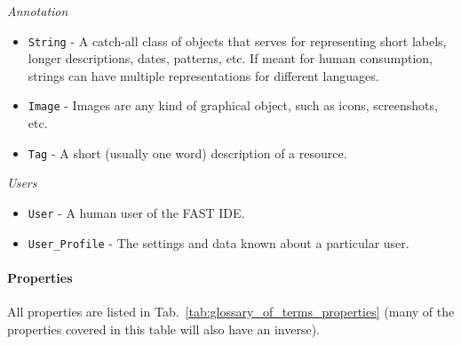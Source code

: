 \documentclass{fast_latex}
\begin{document}
\emph{Annotation}

\begin{itemize}
	\item \texttt{String} - A catch-all class of objects that serves for representing short labels, longer descriptions, dates, patterns, etc. If meant for human consumption, strings can have multiple representations for different languages.
	\item \texttt{Image} - Images are any kind of graphical object, such as icons, screenshots, etc.
	\item \texttt{Tag} - A short (usually one word) description of a resource.
\end{itemize}

\emph{Users}

\begin{itemize}
	\item \texttt{User} - A human user of the FAST IDE.
	\item \texttt{User\_Profile} - The settings and data known about a particular user.
\end{itemize}


\paragraph{Properties} %
\label{par:properties}

All properties are listed in Tab.~\ref{tab:glossary_of_terms_properties} (many of the properties covered in this table will also have an inverse).
\end{document}

